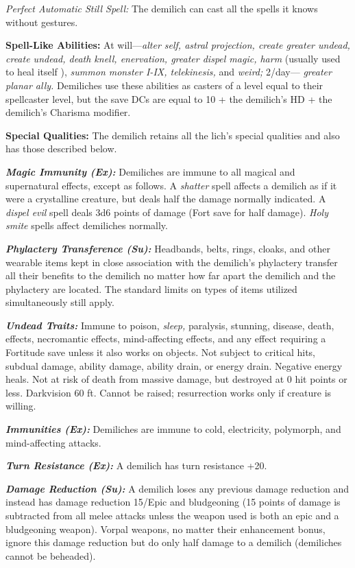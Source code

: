 \documentclass{article}
\begin{document}
\textit{Perfect Automatic Still Spell: }The demilich can cast all the spells it 
knows without gestures. 

\textbf{Spell-Like Abilities:} At will---\textit{alter self, astral projection, 
create greater undead, create undead, death knell, enervation, greater dispel magic, 
harm }(usually used to heal itself ), \textit{summon monster I-IX, telekinesis, 
}and \textit{weird; }2/day--- \textit{greater planar ally. }Demiliches use these 
abilities as casters of a level equal to their spellcaster level, but the save 
DCs are equal to 10 + the demilich's HD + the demilich's Charisma modifier. 

\textbf{Special Qualities:} The demilich retains all the lich's special qualities 
and also has those described below. 

\textit{\textbf{Magic Immunity (Ex):}}\textit{ }Demiliches are immune to all magical 
and supernatural effects, except as follows. A \textit{shatter }spell affects a 
demilich as if it were a crystalline creature, but deals half the damage normally 
indicated. A \textit{dispel evil }spell deals 3d6 points of damage (Fort save for 
half damage). \textit{Holy smite }spells affect demiliches normally. 

\textit{\textbf{Phylactery Transference (Su):}}\textit{ }Headbands, belts, rings, 
cloaks, and other wearable items kept in close association with the demilich's 
phylactery transfer all their benefits to the demilich no matter how far apart 
the demilich and the phylactery are located. The standard limits on types of items 
utilized simultaneously still apply. 

\textit{\textbf{Undead Traits:}}\textit{ }Immune to poison, \textit{sleep, }paralysis, 
stunning, disease, death, effects, necromantic effects, mind-affecting effects, 
and any effect requiring a Fortitude save unless it also works on objects. Not 
subject to critical hits, subdual damage, ability damage, ability drain, or energy 
drain. Negative energy heals. Not at risk of death from massive damage, but destroyed 
at 0 hit points or less. Darkvision 60 ft. Cannot be raised; resurrection works 
only if creature is willing. 

\textit{\textbf{Immunities (Ex):}}\textit{ }Demiliches are immune to cold, electricity, 
polymorph, and mind-affecting attacks. 

\textit{\textbf{Turn Resistance (Ex): }}A demilich has turn resistance +20. 

\textit{\textbf{Damage Reduction (Su):}}\textit{ }A demilich loses any previous 
damage reduction and instead has damage reduction 15/Epic and bludgeoning (15  
points of damage is subtracted from all melee attacks unless the weapon used is 
both an epic and a bludgeoning weapon). Vorpal weapons, no matter their enhancement 
bonus, ignore this damage reduction but do only half damage to a demilich (demiliches 
cannot be beheaded). 
\end{document}
